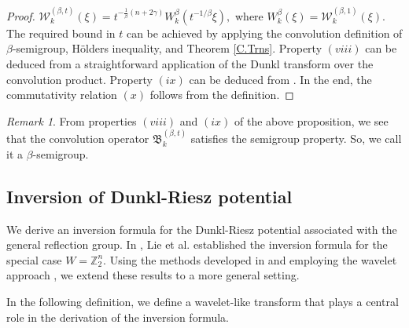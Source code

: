 \documentclass[11pt,a4paper,reqno]{amsproc}
\theoremstyle{definition}
\theoremstyle{remark}
\newtheorem{remark}[theorem]{Remark}
\numberwithin{equation}{section}
\begin{document}
\begin{proof}
        $ \mathcal{W}_k^{(\beta,t)}(\xi)=t^{-\frac{1}{\beta}(n+2\gamma)}W_k^\beta(t^{-1/\beta}\xi),$ where $W_k^\beta(\xi)=\mathcal{W}_k^{(\beta,1)}(\xi).$ The required bound in $t$ can be achieved by applying the convolution definition of $\beta$-semigroup, H\"olders inequality, and Theorem \ref{C.Trns}. Property $(viii)$ can be deduced from a straightforward application of the Dunkl transform over the convolution product.  Property $(ix)$ can be deduced from \cite[Theorem 4.2.]{Thangavelu}.     In the end, the commutativity relation $(x)$ follows from the definition.
\end{proof}
\begin{remark}
     From properties $(viii) $ and $(ix)$ of the above proposition, we see that the convolution operator $\mathfrak{B}_k^{(\beta,t)}$  satisfies the semigroup property. So, we call it a $\beta$-semigroup.
 \end{remark}
\subsection{Inversion of Dunkl-Riesz potential} We derive an inversion formula for the Dunkl-Riesz potential associated with the general reflection group. In \cite{Liu}, Lie et al. established the inversion formula for the special case $W = \mathbb{Z}_2^n$. Using the methods developed in \cite{Liu, Sezer} and employing the wavelet approach \cite{Rubin-1996}, we extend these results to a more general setting.

In the following definition, we define a wavelet-like transform that plays a central role in the derivation of the inversion formula.
\end{document}
